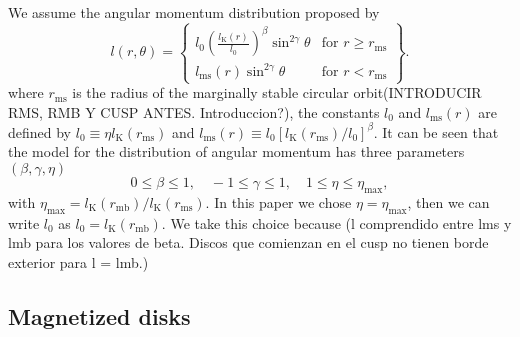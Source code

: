 \documentclass{aa}
\begin{document}
We assume the angular momentum distribution proposed by \citet{Qian:2009} 
\begin{equation}
l (r,\theta) = \left\{ \label{eq:ansatz} 
  \begin{array}{lr}
    l_0 \left(\frac{l_{\mathrm{K}}(r)}{l_0}\right)^{\beta}\sin^{2\gamma}{\theta} &  \text{for } r \geq r_{\mathrm{ms}}\\
    l_{\mathrm{ms}}(r)\sin^{2\gamma}{\theta} & \text{for } r < r_{\mathrm{ms}}
  \end{array}
\right\}.
\end{equation}
where $r_{\mathrm{ms}}$ is the radius of the marginally stable circular orbit(INTRODUCIR RMS, RMB Y CUSP ANTES. Introduccion?), the constants $l_0$ and $l_{\mathrm{ms}}(r)$ are defined by $l_0 \equiv \eta l_{\mathrm{K}}(r_{\mathrm{ms}})$ and $l_{\mathrm{ms}}(r) \equiv l_0 [l_{\mathrm{K}}(r_{\mathrm{ms}})/l_0]^{\beta}$. It can be seen that the model for the distribution of angular momentum has three parameters $(\beta, \gamma, \eta)$
\begin{equation}
0 \leq \beta \leq 1, \quad -1 \leq \gamma \leq 1, \quad 1 \leq \eta \leq \eta_{\mathrm{max}},
\end{equation}
with $\eta_{\mathrm{max}} = l_{\mathrm{K}}(r_{\mathrm{mb}})/l_{\mathrm{K}}(r_{\mathrm{ms}})$. In this paper we chose $\eta = \eta_{\mathrm{max}}$, then we can write $l_0$ as $l_0 = l_{\mathrm{K}}(r_{\mathrm{mb}})$. We take this choice because (l comprendido entre lms y lmb para los valores de beta. Discos que comienzan en el cusp no tienen borde exterior para l = lmb.)

\subsection{Magnetized disks}
\end{document}
